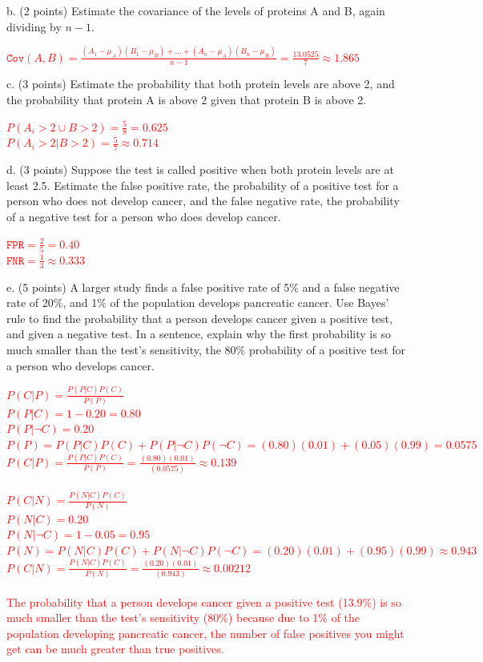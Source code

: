 \documentclass[11pt]{article}
\begin{document}
b. (2 points) Estimate the covariance of the levels of proteins A and B, again dividing by $n-1$.

\textcolor{red}{
$\texttt{Cov}(A, B) = \frac{(A_1 - \mu_A)(B_1 - \mu_B) + \ldots + (A_n - \mu_A)(B_n - \mu_B)}{n-1} = \frac{13.0525}{7} \approx 1.865$
}

c. (3 points) Estimate the probability that both protein levels are above 2, and the probability that protein A is above 2 given that protein B is above 2.

\textcolor{red}{
$P(A_i > 2 \cup B > 2) = \frac{5}{8} = 0.625$\\
$P(A_i > 2 | B > 2) = \frac{5}{7} \approx 0.714$
}

d. (3 points) Suppose the test is called positive when both protein levels are at least 2.5.  Estimate the false positive rate, the probability of a positive test for a person who does not develop cancer, and the false negative rate, the probability of a negative test for a person who does develop cancer.

\textcolor{red}{
$\texttt{FPR} = \frac{2}{5} = 0.40$\\
$\texttt{FNR} = \frac{1}{3} \approx 0.333$
}

e. (5 points) A larger study finds a false positive rate of 5\% and a false negative rate of 20\%, and 1\% of the population develops pancreatic cancer. Use Bayes' rule to find the probability that a person develops cancer given a positive test, and given a negative test.  In a sentence, explain why the first probability is so much smaller than the test's sensitivity, the 80\% probability of a positive test for a person who develops cancer.

\textcolor{red}{
$P(C|P) = \frac{P(P|C) P(C)}{P(P)}$\\
$P(P|C) = 1 - 0.20 = 0.80$\\
$P(P|\neg C) = 0.20$\\
$P(P) = P(P|C)P(C) + P(P|\neg C)P(\neg C) = (0.80)(0.01) + (0.05)(0.99) = 0.0575$\\
$P(C|P) = \frac{P(P|C) P(C)}{P(P)} = \frac{(0.80)(0.01)}{(0.0575)} \approx 0.139$\\
\\
$P(C|N) = \frac{P(N|C) P(C)}{P(N)}$\\
$P(N|C) = 0.20$\\
$P(N|\neg C) = 1 - 0.05 = 0.95$\\
$P(N) = P(N|C)P(C) + P(N|\neg C)P(\neg C) = (0.20)(0.01) + (0.95)(0.99) \approx 0.943$\\
$P(C|N) = \frac{P(N|C) P(C)}{P(N)} = \frac{(0.20)(0.01)}{(0.943)} \approx 0.00212$\\
\\
The probability that a person develops cancer given a positive test (13.9\%) is so much smaller than the test's sensitivity (80\%) because due to 1\% of the population developing pancreatic cancer, the number of false positives you might get can be much greater than true positives.
}
\end{document}
